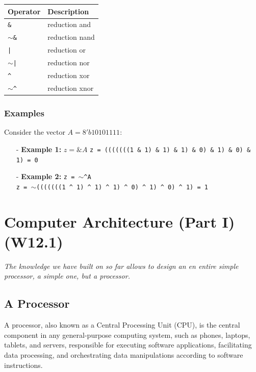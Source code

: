 \documentclass[12pt,openany]{book}
\begin{document}
\begin{center}
	\begin{tabular}{|l|l|}

		\hline	
		Operator & Description \\
		\hline	
		\texttt{\&} & reduction and \\		\hline	
		\texttt{$\sim$\&} & reduction nand \\		\hline	
		\texttt{|} & reduction or \\		\hline	
		\texttt{$\sim$|} & reduction nor \\		\hline	
		\texttt{\^} & reduction xor \\		\hline	
		\texttt{$\sim$\^} & reduction xnor \\		\hline	
		\end{tabular}
	\end{center}
		


\subsection*{Examples}
Consider the vector \( A = 8'b10101111 \):

\begin{itemize}
    \item[-] \textbf{Example 1:} \( z = \&A \)
\newline
\texttt{z = (((((((1 \& 1) \& 1) \& 1) \& 0) \& 1) \& 0) \& 1) = 0}
    \item[-] \textbf{Example 2:} \texttt{z = \texttt{$\sim$}\texttt{\^}A} \\
\texttt{z = \texttt{$\sim$}(((((((1 \texttt{\^} 1) \texttt{\^} 1) \texttt{\^} 1) \texttt{\^} 0) \texttt{\^} 1) \texttt{\^} 0) \texttt{\^} 1) = 1  \\}
\end{itemize}
\chapter{Computer Architecture (Part I) (W12.1)}
\textit{The knowledge we have built on so far allows to design an en entire simple processor, a simple one, but a processor.}
\section{A Processor}

\begin{justify}
	A processor, also known as a Central Processing Unit (CPU), is the central component in any general-purpose computing system, such as phones, laptops, tablets, and servers, responsible for executing software applications, facilitating data processing, and orchestrating data manipulations according to software instructions.
\end{justify}
\end{document}
